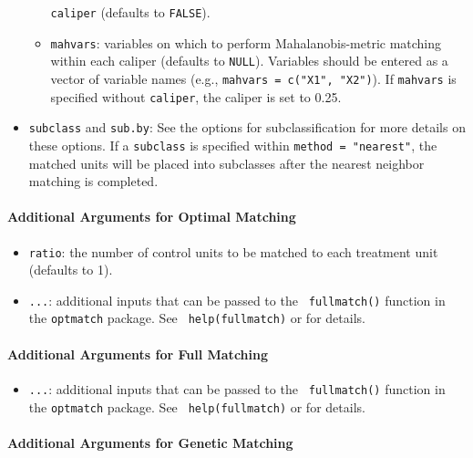 \begin{itemize}
\begin{itemize}
    \texttt{caliper} (defaults to {\tt FALSE}).
  \item \texttt{mahvars}: variables on which to perform
    Mahalanobis-metric matching within each caliper (defaults to {\tt NULL}).
    Variables should be entered as a vector of variable names
    (e.g., \texttt{mahvars = c("X1", "X2")}).  If \texttt{mahvars} is specified without
    \texttt{caliper}, the caliper is set to 0.25.
  \end{itemize}
\item \texttt{subclass} and \texttt{sub.by}: See the options for
  subclassification for more details on these options.  If a
  \texttt{subclass} is specified within \texttt{method = "nearest"},
  the matched units will be placed into subclasses after the nearest
  neighbor matching is completed.
\end{itemize}

\paragraph{Additional Arguments for Optimal Matching}
\label{subsubsec:inputs-optimal}

\begin{itemize}
\item {\tt ratio}: the number of control units to be matched
  to each treatment unit (defaults to 1).
\item {\tt ...}: additional inputs that can be passed to the {\tt
    fullmatch()} function in the {\tt optmatch} package. See {\tt
    help(fullmatch)} or
  for details.
\end{itemize}

\paragraph{Additional Arguments for Full Matching}
\label{subsubsec:inputs-full}

\begin{itemize}
\item {\tt ...}: additional inputs that can be passed to the {\tt
    fullmatch()} function in the {\tt optmatch} package. See {\tt
    help(fullmatch)} or
  for details.
\end{itemize}

\paragraph{Additional Arguments for Genetic Matching}
\label{subsubsec:inputs-genetic}

